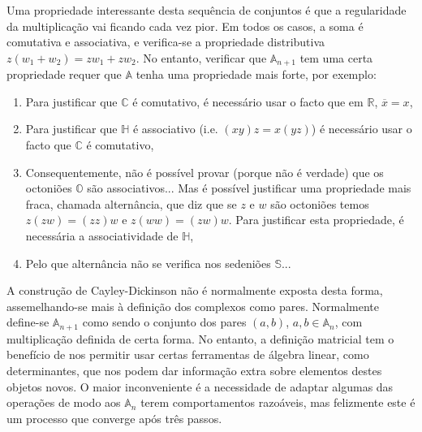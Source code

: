 \documentclass{article}
\newcommand{\R}{\mathbb{R}}
\newcommand{\C}{\mathbb{C}}
\renewcommand{\H}{\mathbb{H}}
\renewcommand{\O}{\mathbb{O}}
\begin{document}
Uma propriedade interessante desta sequência de conjuntos é que a regularidade da multiplicação vai ficando cada vez pior. Em todos os casos, a soma é comutativa e associativa, e verifica-se a propriedade distributiva $z(w_1 + w_2) = z w_1 + z w_2$. No entanto, verificar que $\mathbb{A}_{n+1}$ tem uma certa propriedade requer que $\mathbb{A}$ tenha uma propriedade mais forte, por exemplo:
\begin{enumerate}[label=\roman*)]
\item Para justificar que $\C$ é comutativo, é necessário usar o facto que em $\R$, $\overline{x} = x$,
\item Para justificar que $\H$ é associativo (i.e. $(xy)z = x(yz)$) é necessário usar o facto que $\C$ é comutativo,
\item Consequentemente, não é possível provar (porque não é verdade) que os octoniões $\O$ são associativos... Mas é possível justificar uma propriedade mais fraca, chamada alternância, que diz que se $z$ e $w$ são octoniões temos $z(zw) = (zz)w$ e $z(ww) = (zw)w$. Para justificar esta propriedade, é necessária a associatividade de $\H$,
\item Pelo que alternância não se verifica nos sedeniões $\mathbb{S}$...
\end{enumerate}

A construção de Cayley-Dickinson não é normalmente exposta desta forma, assemelhando-se mais à definição dos complexos como pares. Normalmente define-se $\mathbb{A}_{n+1}$ como sendo o conjunto dos pares $(a,b)$, $a,b \in \mathbb{A}_n$, com multiplicação definida de certa forma. No entanto, a definição matricial tem o benefício de nos permitir usar certas ferramentas de álgebra linear, como determinantes, que nos podem dar informação extra sobre elementos destes objetos novos. O maior inconveniente é a necessidade de adaptar algumas das operações de modo aos $\mathbb{A}_n$ terem comportamentos razoáveis, mas felizmente este é um processo que converge após três passos.
\end{document}
